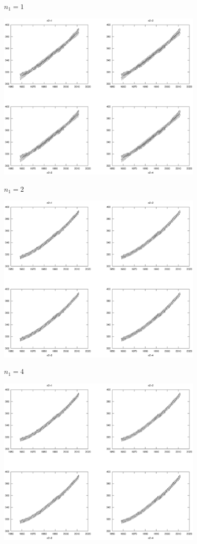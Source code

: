 \documentclass[11pt,a4paper]{article}
\begin{document}
\begin{enumerate}
		$n_1=1$
		\begin{center}
			\includegraphics[width=0.75\textwidth]{pt1.eps}
		\end{center}
		$n_1=2$
		\begin{center}
			\includegraphics[width=0.75\textwidth]{pt2.eps}
		\end{center}
		$n_1=4$
		\begin{center}
			\includegraphics[width=0.75\textwidth]{pt3.eps}
		\end{center}
		

\end{enumerate}
\end{document}
